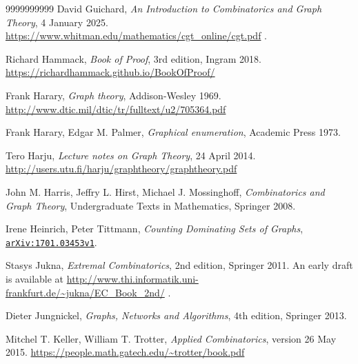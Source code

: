 \documentclass[numbers=enddot,12pt,final,onecolumn,notitlepage]{scrartcl}%
\theoremstyle{definition}
\newcommand\arxiv[1]{\href{http://www.arxiv.org/abs/#1}{\texttt{arXiv:#1}}}
\begin{document}
\begin{thebibliography}{9999999999}
David Guichard,
\textit{An Introduction to Combinatorics and Graph Theory},
4 January 2025.
\newline\url{https://www.whitman.edu/mathematics/cgt_online/cgt.pdf} .

Richard Hammack,
\textit{Book of Proof},
3rd edition, Ingram 2018.
\newline\url{https://richardhammack.github.io/BookOfProof/}

Frank Harary,
\textit{Graph theory},
Addison-Wesley 1969.
\newline\url{http://www.dtic.mil/dtic/tr/fulltext/u2/705364.pdf}

Frank Harary, Edgar M. Palmer,
\textit{Graphical enumeration},
Academic Press 1973.

Tero Harju,
\textit{Lecture notes on Graph Theory},
24 April 2014.
\newline\url{http://users.utu.fi/harju/graphtheory/graphtheory.pdf}

John M. Harris, Jeffry L. Hirst, Michael J. Mossinghoff,
\textit{Combinatorics and Graph Theory}, Undergraduate Texts in
Mathematics, Springer 2008.


Irene Heinrich, Peter Tittmann,
\textit{Counting Dominating Sets of Graphs},
\arxiv{1701.03453v1}.

Stasys Jukna,
\textit{Extremal Combinatorics}, 2nd edition, Springer 2011.
An early draft is available at
\url{http://www.thi.informatik.uni-frankfurt.de/~jukna/EC_Book_2nd/} .

Dieter Jungnickel,
\textit{Graphs, Networks and Algorithms},
4th edition, Springer 2013.


Mitchel T. Keller, William T. Trotter,
\textit{Applied Combinatorics},
version 26 May 2015.
\newline \url{https://people.math.gatech.edu/~trotter/book.pdf}


\end{thebibliography}
\end{document}
